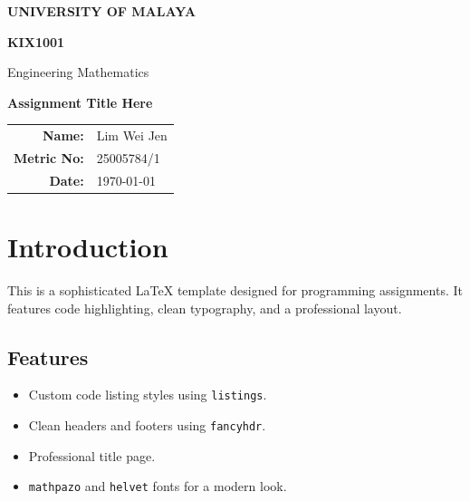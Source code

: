 \documentclass{article}
\newcommand{\assignmentTitle}{Assignment Title Here}
\newcommand{\courseCode}{KIX1001}
\newcommand{\courseName}{Engineering Mathematics}
\newcommand{\studentName}{Lim Wei Jen}
\newcommand{\studentID}{25005784/1}
\newcommand{\submissionDate}{\today}
\begin{document}
\begin{titlepage}
	\centering
	\vspace*{2cm}
	
	{\Huge\bfseries\sffamily\color{umblue} UNIVERSITY OF MALAYA \par}
	\vspace{1cm}
	{\Large\bfseries \courseCode \par}
	{\large \courseName \par}
	\vspace{3cm}
	
	{\Huge\bfseries \assignmentTitle \par}
	\vspace{3cm}
	
	\begin{tcolorbox}[colback=white,colframe=umblue,width=0.8\textwidth,arc=0mm,boxrule=1pt]
		\centering
		\large
		\begin{tabular}{rl}
			\textbf{Name:} & \studentName \\
			\textbf{Metric No:} & \studentID \\
			\textbf{Date:} & \submissionDate
		\end{tabular}
	\end{tcolorbox}
	
	\vfill
	

\end{titlepage}


\tableofcontents
\newpage

\section{Introduction}
This is a sophisticated LaTeX template designed for programming assignments. It features code highlighting, clean typography, and a professional layout.

\subsection{Features}
\begin{itemize}
    \item Custom code listing styles using \texttt{listings}.
    \item Clean headers and footers using \texttt{fancyhdr}.
    \item Professional title page.
    \item \texttt{mathpazo} and \texttt{helvet} fonts for a modern look.
\end{itemize}
\end{document}
